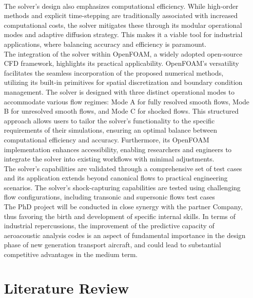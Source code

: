 \documentclass[a5paper]{sapthesis}
\begin{document}
	\\
	The solver’s design also emphasizes computational efficiency. While high-order methods and explicit time-stepping are traditionally associated with increased computational costs, the solver mitigates these through its modular operational modes and adaptive diffusion strategy. This makes it a viable tool for industrial applications, where balancing accuracy and efficiency is paramount. 
	\\
	The integration of the solver within OpenFOAM, a widely adopted open-source CFD framework, highlights its practical applicability. OpenFOAM’s versatility facilitates the seamless incorporation of the proposed numerical methods, utilizing its built-in primitives for spatial discretization and boundary condition management. The solver is designed with three distinct operational modes to accommodate various flow regimes: Mode A for fully resolved smooth flows, Mode B for unresolved smooth flows, and Mode C for shocked flows. This structured approach allows users to tailor the solver’s functionality to the specific requirements of their simulations, ensuring an optimal balance between computational efficiency and accuracy. Furthermore, its OpenFOAM implementation enhances accessibility, enabling researchers and engineers to integrate the solver into existing workflows with minimal adjustments.
	\\
	The solver's capabilities are validated through a comprehensive set of test cases and its application extends beyond canonical flows to practical engineering scenarios. The solver’s shock-capturing capabilities are tested using challenging flow configurations, including transonic and supersonic flows test cases
	\\
	The PhD project will be conducted in close synergy with the partner Company, thus favoring the birth and development of specific internal skills. In terms of industrial repercussions, the improvement of the predictive capacity of aeroacoustic analysis codes is an aspect of fundamental importance in the design phase of new generation transport aircraft, and could lead to substantial competitive advantages in the medium term.
	
	\chapter{Literature Review}
	\label{chap:literature}
	
\end{document}
